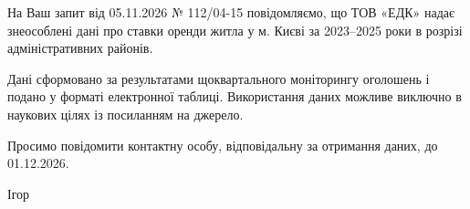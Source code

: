 \documentclass[14pt]{dstu4163}   %
\begin{document}


На Ваш запит від 05.11.2026 № 112/04-15 повідомляємо, що ТОВ «ЕДК» надає
знеособлені дані про ставки оренди житла у м. Києві за 2023–2025 роки
в розрізі адміністративних районів.

Дані сформовано за результатами щоквартального моніторингу оголошень
і подано у форматі електронної таблиці. Використання даних можливе
виключно в наукових цілях із посиланням на джерело.

Просимо повідомити контактну особу, відповідальну за отримання
даних, до 01.12.2026.


\signature{Директор}{Ігор }

\end{document}
